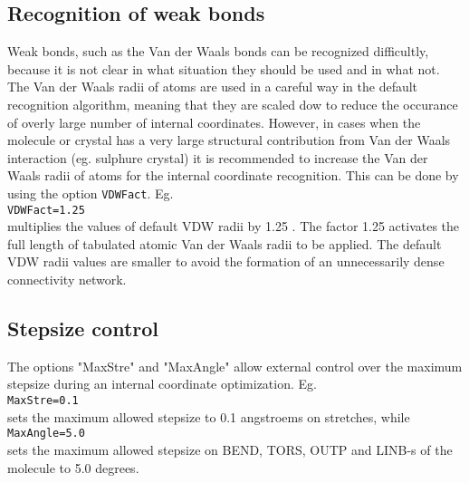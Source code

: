 \documentclass[prl,aps,preprint,superbib,12pt]{revtex4}
\begin{document}
\subsection{Recognition of weak bonds}
Weak bonds, such as the Van der Waals bonds can be recognized difficultly,
because it is not clear in what situation they should be used and in what 
not.
The Van der Waals radii of atoms are used in a careful way in the default 
recognition algorithm, meaning that they are scaled dow to reduce the occurance
of overly large number of internal coordinates.
However, in cases when the molecule or crystal has a very large structural
contribution from Van der Waals interaction (eg. sulphure crystal) it is recommended to increase the Van der Waals radii of atoms for the internal coordinate 
recognition. This can be done by using the option {\tt VDWFact}.
Eg. 
\\
{\tt VDWFact=1.25}
\\ 
multiplies the values of default VDW radii by 1.25 . The factor 1.25 activates 
the full length of tabulated atomic Van der Waals radii to be applied.
The default VDW radii values are smaller to avoid the formation of an unnecessarily dense connectivity network.

\subsection{Stepsize control}
The options "MaxStre" and "MaxAngle" allow external control over the maximum
stepsize during an internal coordinate optimization.
Eg.
\\
{\tt MaxStre=0.1} 
\\
sets the maximum allowed stepsize to 0.1 angstroems on stretches,
while
\\
{\tt MaxAngle=5.0}
\\
sets the maximum allowed stepsize on BEND, TORS, OUTP and LINB-s of the 
molecule to 5.0 degrees.
\end{document}
